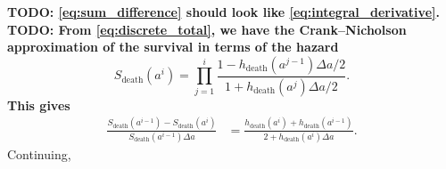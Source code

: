 \documentclass[12pt]{article}
\begin{document}
\textbf{TODO: \eqref{eq:sum_difference} should look like
  \eqref{eq:integral_derivative}.}
%
\textbf{TODO: From \eqref{eq:discrete_total}, we have the
  Crank--Nicholson approximation of the survival in terms of the
  hazard}
\begin{displaymath}
  S_{\text{death}}(a^i)
  = \prod_{j = 1}^i
  \frac{1 - h_{\text{death}}(a^{j - 1}) \Delta a / 2}
  {1 + h_{\text{death}}(a^j) \Delta a / 2}.
\end{displaymath}
\textbf{This gives}
\begin{displaymath}
  \begin{split}
    \frac{S_{\text{death}}(a^{i - 1}) - S_{\text{death}}(a^i)}
    {S_{\text{death}}(a^{i - 1}) \Delta a}
    &= \frac{h_{\text{death}}(a^i) + h_{\text{death}}(a^{i - 1})}
    {2 + h_{\text{death}}(a^i) \Delta a}.
  \end{split}
\end{displaymath}
%
Continuing,
\end{document}
